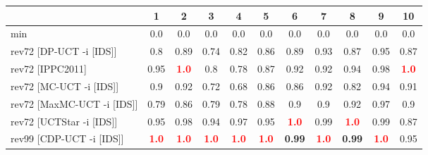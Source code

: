 \documentclass{article}
\begin{document}
\begin{tabular}{|l|r@{$\pm$}rr@{$\pm$}rr@{$\pm$}rr@{$\pm$}rr@{$\pm$}rr@{$\pm$}rr@{$\pm$}rr@{$\pm$}rr@{$\pm$}rr@{$\pm$}r|}
\hline

& \multicolumn{2}{c}{1}
& \multicolumn{2}{c}{2}
& \multicolumn{2}{c}{3}
& \multicolumn{2}{c}{4}
& \multicolumn{2}{c}{5}
& \multicolumn{2}{c}{6}
& \multicolumn{2}{c}{7}
& \multicolumn{2}{c}{8}
& \multicolumn{2}{c}{9}
& \multicolumn{2}{c|}{10}
\\
\hline
\hline
min
& \multicolumn{2}{c}{0.0}
& \multicolumn{2}{c}{0.0}
& \multicolumn{2}{c}{0.0}
& \multicolumn{2}{c}{0.0}
& \multicolumn{2}{c}{0.0}
& \multicolumn{2}{c}{0.0}
& \multicolumn{2}{c}{0.0}
& \multicolumn{2}{c}{0.0}
& \multicolumn{2}{c}{0.0}
& \multicolumn{2}{c|}{0.0}
\\
rev72 [DP-UCT -i [IDS]]
& \multicolumn{2}{c}{0.8}
& \multicolumn{2}{c}{0.89}
& \multicolumn{2}{c}{0.74}
& \multicolumn{2}{c}{0.82}
& \multicolumn{2}{c}{0.86}
& \multicolumn{2}{c}{0.89}
& \multicolumn{2}{c}{0.93}
& \multicolumn{2}{c}{0.87}
& \multicolumn{2}{c}{0.95}
& \multicolumn{2}{c|}{0.87}
\\
rev72 [IPPC2011]
& \multicolumn{2}{c}{0.95}
& \multicolumn{2}{c}{\textbf{\textcolor{red}{1.0}}}
& \multicolumn{2}{c}{0.8}
& \multicolumn{2}{c}{0.78}
& \multicolumn{2}{c}{0.87}
& \multicolumn{2}{c}{0.92}
& \multicolumn{2}{c}{0.92}
& \multicolumn{2}{c}{0.94}
& \multicolumn{2}{c}{0.98}
& \multicolumn{2}{c|}{\textbf{\textcolor{red}{1.0}}}
\\
rev72 [MC-UCT -i [IDS]]
& \multicolumn{2}{c}{0.9}
& \multicolumn{2}{c}{0.92}
& \multicolumn{2}{c}{0.72}
& \multicolumn{2}{c}{0.68}
& \multicolumn{2}{c}{0.86}
& \multicolumn{2}{c}{0.86}
& \multicolumn{2}{c}{0.92}
& \multicolumn{2}{c}{0.82}
& \multicolumn{2}{c}{0.94}
& \multicolumn{2}{c|}{0.91}
\\
rev72 [MaxMC-UCT -i [IDS]]
& \multicolumn{2}{c}{0.79}
& \multicolumn{2}{c}{0.86}
& \multicolumn{2}{c}{0.79}
& \multicolumn{2}{c}{0.78}
& \multicolumn{2}{c}{0.88}
& \multicolumn{2}{c}{0.9}
& \multicolumn{2}{c}{0.9}
& \multicolumn{2}{c}{0.92}
& \multicolumn{2}{c}{0.97}
& \multicolumn{2}{c|}{0.9}
\\
rev72 [UCTStar -i [IDS]]
& \multicolumn{2}{c}{0.95}
& \multicolumn{2}{c}{0.98}
& \multicolumn{2}{c}{0.94}
& \multicolumn{2}{c}{0.97}
& \multicolumn{2}{c}{0.95}
& \multicolumn{2}{c}{\textbf{\textcolor{red}{1.0}}}
& \multicolumn{2}{c}{0.99}
& \multicolumn{2}{c}{\textbf{\textcolor{red}{1.0}}}
& \multicolumn{2}{c}{0.99}
& \multicolumn{2}{c|}{0.87}
\\
\hline
rev99 [CDP-UCT -i [IDS]]
& \multicolumn{2}{c}{\textbf{\textcolor{red}{1.0}}}
& \multicolumn{2}{c}{\textbf{\textcolor{red}{1.0}}}
& \multicolumn{2}{c}{\textbf{\textcolor{red}{1.0}}}
& \multicolumn{2}{c}{\textbf{\textcolor{red}{1.0}}}
& \multicolumn{2}{c}{\textbf{\textcolor{red}{1.0}}}
& \multicolumn{2}{c}{\textbf{0.99}}
& \multicolumn{2}{c}{\textbf{\textcolor{red}{1.0}}}
& \multicolumn{2}{c}{\textbf{0.99}}
& \multicolumn{2}{c}{\textbf{\textcolor{red}{1.0}}}
& \multicolumn{2}{c|}{0.95}
\\
\hline
\end{tabular}%
\end{document}
